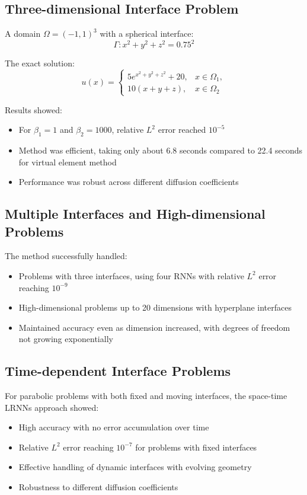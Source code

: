 \documentclass[11pt]{article}
\begin{document}
\subsection{Three-dimensional Interface Problem}
A domain $\Omega = (-1,1)^3$ with a spherical interface:
\begin{equation}
\Gamma: x^2 + y^2 + z^2 = 0.75^2
\end{equation}

The exact solution:
\begin{equation}
u(x) = 
\begin{cases}
5e^{x^2+y^2+z^2} + 20, & x \in \Omega_1, \\
10(x+y+z), & x \in \Omega_2
\end{cases}
\end{equation}

Results showed:
\begin{itemize}
    \item For $\beta_1 = 1$ and $\beta_2 = 1000$, relative $L^2$ error reached $10^{-5}$
    \item Method was efficient, taking only about 6.8 seconds compared to 22.4 seconds for virtual element method
    \item Performance was robust across different diffusion coefficients
\end{itemize}

\subsection{Multiple Interfaces and High-dimensional Problems}
The method successfully handled:
\begin{itemize}
    \item Problems with three interfaces, using four RNNs with relative $L^2$ error reaching $10^{-9}$
    \item High-dimensional problems up to 20 dimensions with hyperplane interfaces
    \item Maintained accuracy even as dimension increased, with degrees of freedom not growing exponentially
\end{itemize}

\subsection{Time-dependent Interface Problems}
For parabolic problems with both fixed and moving interfaces, the space-time LRNNs approach showed:
\begin{itemize}
    \item High accuracy with no error accumulation over time
    \item Relative $L^2$ error reaching $10^{-7}$ for problems with fixed interfaces
    \item Effective handling of dynamic interfaces with evolving geometry
    \item Robustness to different diffusion coefficients
\end{itemize}
\end{document}
